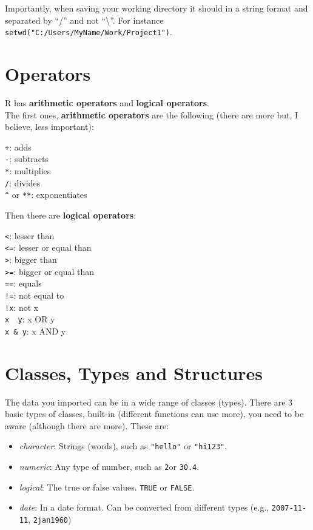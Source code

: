 \documentclass[
]{book}
\begin{document}
Importantly, when saving your working directory it should in a string format and separated by ``/'' and not ``\textbackslash{}''.
For instance \texttt{setwd("C:/Users/MyName/Work/Project1")}.

\hypertarget{operators}{%
\section{Operators}\label{operators}}

R has \textbf{arithmetic operators} and \textbf{logical operators}.\\
The first ones, \textbf{arithmetic operators} are the following (there are more but, I believe, less important):

\texttt{+}: adds\\
\texttt{-}: subtracts\\
\texttt{*}: multiplies\\
\texttt{/}: divides\\
\texttt{\^{}} or \texttt{**}: exponentiates

Then there are \textbf{logical operators}:

\texttt{\textless{}}: lesser than\\
\texttt{\textless{}=}: lesser or equal than\\
\texttt{\textgreater{}}: bigger than\\
\texttt{\textgreater{}=}: bigger or equal than\\
\texttt{==}: equals\\
\texttt{!=}: not equal to\\
\texttt{!x}: not x\\
\texttt{x\ \textbar{}\ y}: x OR y\\
\texttt{x\ \&\ y}: x AND y

\hypertarget{classes-types-and-structures}{%
\section{Classes, Types and Structures}\label{classes-types-and-structures}}

The data you imported can be in a wide range of classes (types).
There are 3 basic types of classes, built-in (different functions can use more), you need to be aware (although there are more).
These are:

\begin{itemize}
\item
  \emph{character}: Strings (words), such as \texttt{"hello"} or \texttt{"hi123"}.\\
\item
  \emph{numeric}: Any type of number, such as \texttt{2}or \texttt{30.4}.\\
\item
  \emph{logical}: The true or false values.
  \texttt{TRUE} or \texttt{FALSE}.
\item
  \emph{date}: In a date format.
  Can be converted from different types (e.g., \texttt{2007-11-11}, \texttt{2jan1960})
\end{itemize}
\end{document}
